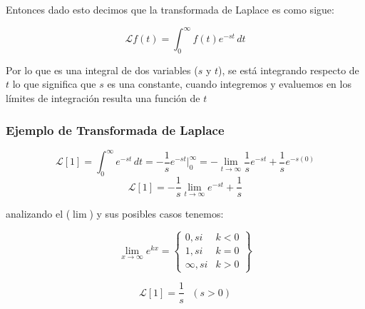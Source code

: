 \documentclass[landscape,twocolumn,letter]{book}
\begin{document}
		
		Entonces dado esto decimos que la transformada de Laplace es como sigue:
		
		\[ \mathscr{L}{f(t)} = \int_{0}^{\infty} f(t)e^{-st} \,dt \]
		
		Por lo que es una integral de dos variables (\(s\) y \(t\)), se está integrando respecto de \(t\) lo que significa que \(s\) es una constante, cuando integremos y evaluemos en los límites de integración resulta una función de \(t\)
		
		\subsubsection{Ejemplo de Transformada de Laplace}
		\[ \mathscr{L}{[1]} = \int_{0}^{\infty} e^{-st} \,dt = -\frac{1}{s} e^{-st} \bigg\rvert_{0}^{\infty} = -\lim_{t\to\infty}\frac{1}{s} e^{-st} + \frac{1}{s} e^{-s(0)} \]
		\[ \mathscr{L}{[1]} = -\frac{1}{s} \lim_{t\to\infty} e^{-st} + \frac{1}{s} \]
		
		
		analizando el (\(\lim\)) y sus posibles casos tenemos:
		
		\[ \lim_{x\to\infty} e^{kx} = \begin{Bmatrix}
			0, si & k<0 \\
			1, si & k=0 \\
			\infty, si & k>0
		\end{Bmatrix} \]		
		
		
		\[  \mathscr{L}{[1]} = \frac{1}{s} \,\,\,\, (s>0) \]
		
\end{document}
